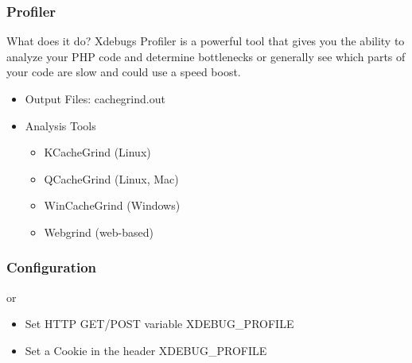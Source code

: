\begin{frame}\frametitle{Profiler}
    \begin{block}{What does it do?}
    Xdebugs Profiler is a powerful tool that gives you the ability 
    to analyze your PHP code and determine bottlenecks or generally 
    see which parts of your code are slow and could use a speed boost.
    \end{block} \pause
    \begin{itemize}
        \item Output Files: cachegrind.out \pause
        \item Analysis Tools 
            \begin{itemize} 
            \item KCacheGrind (Linux)
            \item QCacheGrind (Linux, Mac)
            \item WinCacheGrind (Windows)
            \item Webgrind (web-based)
            \end{itemize}
    \end{itemize}
\end{frame}

\begin{frame}\frametitle{Configuration}
    
    or
    \begin{itemize}
        \item Set HTTP GET/POST variable XDEBUG\_PROFILE
        \item Set a Cookie in the header XDEBUG\_PROFILE
    \end{itemize}
\end{frame}
